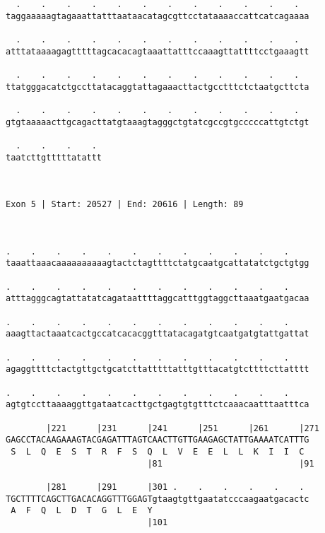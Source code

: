 \documentclass{article}
\begin{document}
\begin{Verbatim}
  .    .    .    .    .    .    .    .    .    .    .    .  
taggaaaaagtagaaattatttaataacatagcgttcctataaaaccattcatcagaaaa
                                                            
  .    .    .    .    .    .    .    .    .    .    .    .  
atttataaaagagtttttagcacacagtaaattatttccaaagttattttcctgaaagtt
                                                            
  .    .    .    .    .    .    .    .    .    .    .    .  
ttatgggacatctgccttatacaggtattagaaacttactgcctttctctaatgcttcta
                                                            
  .    .    .    .    .    .    .    .    .    .    .    .  
gtgtaaaaacttgcagacttatgtaaagtagggctgtatcgccgtgcccccattgtctgt
                                                            
  .    .    .    . 
taatcttgtttttatattt
                   
                   
 
Exon 5 | Start: 20527 | End: 20616 | Length: 89



.    .    .    .    .    .    .    .    .    .    .    .    
taaattaaacaaaaaaaaaagtactctagttttctatgcaatgcattatatctgctgtgg
                                                            
.    .    .    .    .    .    .    .    .    .    .    .    
atttagggcagtattatatcagataattttaggcatttggtaggcttaaatgaatgacaa
                                                            
.    .    .    .    .    .    .    .    .    .    .    .    
aaagttactaaatcactgccatcacacggtttatacagatgtcaatgatgtattgattat
                                                            
.    .    .    .    .    .    .    .    .    .    .    .    
agaggttttctactgttgctgcatcttatttttatttgtttacatgtcttttcttatttt
                                                            
.    .    .    .    .    .    .    .    .    .    .    .    
agtgtccttaaaaggttgataatcacttgctgagtgtgtttctcaaacaatttaatttca
                                                            
        |221      |231      |241      |251      |261      |271
GAGCCTACAAGAAAGTACGAGATTTAGTCAACTTGTTGAAGAGCTATTGAAAATCATTTG
 S  L  Q  E  S  T  R  F  S  Q  L  V  E  E  L  L  K  I  I  C 
                            |81                           |91
  
        |281      |291      |301 .    .    .    .    .    . 
TGCTTTTCAGCTTGACACAGGTTTGGAGTgtaagtgttgaatatcccaagaatgacactc
 A  F  Q  L  D  T  G  L  E  Y                               
                            |101                            
  

\end{Verbatim}
\end{document}
